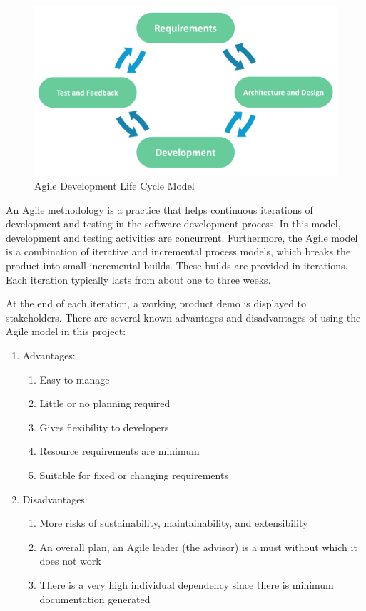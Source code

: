 \begin{figure}[htb]
\centering
\includegraphics[width=\textwidth]{section02/assets/Agile.png}
\caption[Agile Development Life Cycle Model]{\label{fig:Agile Model}Agile Development Life Cycle Model}
\end{figure}

An Agile methodology is a practice that helps continuous iterations of development and testing in the software development process. In this model, development and testing activities are concurrent. Furthermore, the Agile model is a combination of iterative and incremental process models, which breaks the product into small incremental builds. These builds are provided in iterations. Each iteration typically lasts from about one to three weeks.

At the end of each iteration, a working product demo is displayed to stakeholders. There are several known advantages and disadvantages of using the Agile model in this project:
\begin{enumerate}

  \item Advantages:
  \begin{enumerate}
    \item Easy to manage
    \item Little or no planning required
    \item Gives flexibility to developers
    \item Resource requirements are minimum
    \item Suitable for fixed or changing requirements
  \end{enumerate}

  \item Disadvantages:
  \begin{enumerate}
    \item More risks of sustainability, maintainability, and extensibility
    \item An overall plan, an Agile leader (the advisor) is a must without which it does not work
    \item There is a very high individual dependency since there is minimum documentation generated
  \end{enumerate}

\end{enumerate}
